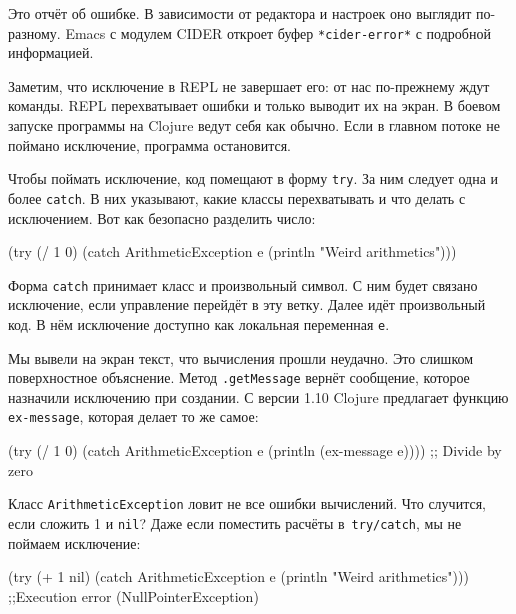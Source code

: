 Это отчёт об ошибке. В зависимости от редактора и настроек оно выглядит
по-разному. Emacs с модулем CIDER откроет буфер \texttt{*cider\--error*}
с подробной информацией.


Заметим, что исключение в REPL не завершает его: от нас по-прежнему ждут
команды. REPL перехватывает ошибки и только выводит их на экран. В боевом
запуске программы на Clojure ведут себя как обычно. Если в главном потоке не
поймано исключение, программа остановится.

Чтобы поймать исключение, код помещают в форму \verb|try|. За ним следует одна
и более \verb|catch|. В них указывают, какие классы перехватывать и что делать
с исключением. Вот как безопасно разделить число:


\begin{english}
  \begin{clojure}
(try
  (/ 1 0)
  (catch ArithmeticException e
    (println "Weird arithmetics")))
  \end{clojure}
\end{english}

Форма \verb|catch| принимает класс и произвольный символ. С ним будет связано
исключение, если управление перейдёт в эту ветку. Далее идёт произвольный код. В
нём исключение доступно как локальная переменная \verb|e|.


Мы вывели на экран текст, что вычисления прошли неудачно. Это слишком
поверхностное объяснение. Метод \verb|.getMessage| вернёт сообщение, которое
назначили исключению при создании. С версии 1.10 Clojure предлагает функцию
\verb|ex-message|, которая делает то же самое:

\begin{english}
  \begin{clojure}
(try
  (/ 1 0)
  (catch ArithmeticException e
    (println (ex-message e))))
;; Divide by zero
  \end{clojure}
\end{english}

Класс \verb|ArithmeticException| ловит не все ошибки вычислений. Что случится,
если сложить 1 и \verb|nil|? Даже если поместить расчёты в~\verb|try/catch|,
мы не поймаем исключение:

\ifx\devicetype\mobile

\begin{english}
  \begin{clojure}
(try
  (+ 1 nil)
  (catch ArithmeticException e
    (println "Weird arithmetics")))
;;Execution error (NullPointerException)
  \end{clojure}
\end{english}

